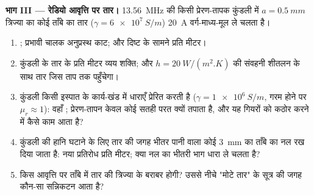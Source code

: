 \begin{problem}
\medskip
\noindent\textbf{भाग III --- रेडियो आवृत्ति पर तार।}
\qty{13.56}{MHz} की किसी प्रेरण-तापक कुंडली में $a = \qty{0.5}{mm}$ त्रिज्या का कोई
ताँबे का तार ($\gamma = \qty{6e7}{S/m}$) \qty{20}{A} वर्ग-माध्य-मूल ले चलता है।
\begin{enumerate}[resume]
  \item {}; प्रभावी चालक अनुप्रस्थ काट; और दिष्ट के सामने
         प्रति मीटर।
  \item कुंडली के तार के प्रति मीटर व्यय शक्ति; और $h = \qty{20}{W/(m^2.K)}$
        की संवहनी शीतलन के साथ तार जिस ताप तक पहुँचेगा।
  \item कुंडली किसी इस्पात के कार्य-खंड में धाराएँ प्रेरित करती है ($\gamma =
        \qty{1e6}{S/m}$, गरम होने पर $\mu_r \approx 1$): वहाँ ;
        प्रेरण-तापन केवल कोई सतही परत क्यों तपाता है, और यह
        गियरों को कठोर करने में कैसे काम आता है?
  \item कुंडली की हानि घटाने के लिए तार की जगह भीतर पानी वाला कोई
        \qty{3}{mm} का ताँबे का नल रख दिया जाता है: नया प्रतिरोध प्रति मीटर;
        क्या नल का भीतरी भाग धारा ले चलता है?
  \item किस आवृत्ति पर ताँबे में  तार की त्रिज्या के बराबर
        होगी? उससे नीचे "मोटे तार" के सूत्र की जगह कौन-सा
        सन्निकटन आता है?
\end{enumerate}


\end{problem}

